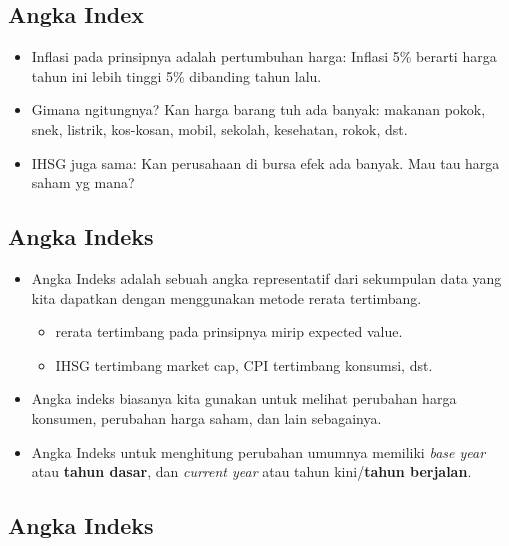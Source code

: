 \documentclass[
  letterpaper,
  DIV=11,
  numbers=noendperiod]{scrartcl}
\begin{document}
\subsection{Angka Index}\label{angka-index}

\begin{itemize}
\item
  Inflasi pada prinsipnya adalah pertumbuhan harga: Inflasi 5\% berarti
  harga tahun ini lebih tinggi 5\% dibanding tahun lalu.
\item
  Gimana ngitungnya? Kan harga barang tuh ada banyak: makanan pokok,
  snek, listrik, kos-kosan, mobil, sekolah, kesehatan, rokok, dst.
\item
  IHSG juga sama: Kan perusahaan di bursa efek ada banyak. Mau tau harga
  saham yg mana?
\end{itemize}

\subsection{Angka Indeks}\label{angka-indeks}

\begin{itemize}
\item
  Angka Indeks adalah sebuah angka representatif dari sekumpulan data
  yang kita dapatkan dengan menggunakan metode rerata tertimbang.

  \begin{itemize}
  \item
    rerata tertimbang pada prinsipnya mirip expected value.
  \item
    IHSG tertimbang market cap, CPI tertimbang konsumsi, dst.
  \end{itemize}
\item
  Angka indeks biasanya kita gunakan untuk melihat perubahan harga
  konsumen, perubahan harga saham, dan lain sebagainya.
\item
  Angka Indeks untuk menghitung perubahan umumnya memiliki \emph{base
  year} atau \textbf{tahun dasar}, dan \emph{current year} atau tahun
  kini/\textbf{tahun berjalan}.
\end{itemize}

\subsection{Angka Indeks}\label{angka-indeks-1}
\end{document}
